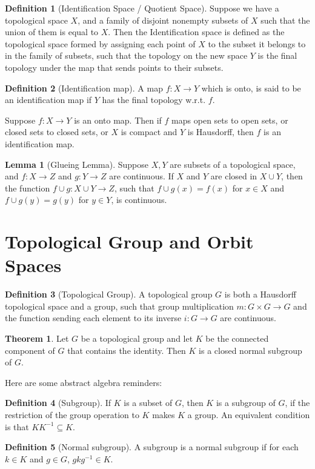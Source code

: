 \documentclass{article}
\theoremstyle{definition}
\newtheorem{definition}{Definition}[section]
\newtheorem{lemma}{Lemma}[section]
\newtheorem{theorem}{Theorem}[section]
\theoremstyle{remark}
\theoremstyle{remark}
\begin{document}
\begin{definition}[Identification Space / Quotient Space]
    Suppose we have a topological space $X$, and a family of disjoint nonempty subsets of $X$ such that the union of them is equal to $X$. Then the Identification space is defined as the topological space formed by assigning each point of $X$ to the subset it belongs to in the family of subsets, such that the topology on the new space $Y$ is the final topology under the map that sends points to their subsets.
\end{definition}

\begin{definition}[Identification map]
    A map $f: X \to Y$ which is onto, is said to be an identification map if $Y$ has the final topology w.r.t. $f$. 
\end{definition}
Suppose $f: X \to Y$ is an onto map. Then if $f$ maps open sets to open sets, or closed sets to closed sets, or $X$ is compact and $Y$ is Hausdorff, then $f$ is an identification map. 

\begin{lemma}[Glueing Lemma]
    Suppose $X, Y$ are subsets of a topological space, and $f: X \to Z$ and $g: Y \to Z$ are continuous. If $X$ and $Y$ are closed in $X \cup Y$, then the function $f \cup g: X \cup Y \to Z$, such that $f\cup g(x) = f(x)$ for $x \in X$ and $f \cup g (y) = g(y)$ for $y \in Y$, is continuous. 
\end{lemma}

\section{Topological Group and Orbit Spaces}

\begin{definition}[Topological Group]
    A topological group $G$ is both a Hausdorff topological space and a group, such that group multiplication $m: G\times G \to G$ and the function sending each element to its inverse $i: G \to G$ are continuous.
\end{definition}

\begin{theorem}
    Let $G$ be a topological group and let $K$ be the connected component of $G$ that contains the identity. Then $K$ is a closed normal subgroup of $G$.
\end{theorem}

Here are some abstract algebra reminders:

\begin{definition}[Subgroup]
If $K$ is a subset of $G$, then $K$ is a subgroup of $G$, if the restriction of the group operation to $K$ makes $K$ a group. An equivalent condition is that $KK^{-1} \subseteq K$. 
\end{definition}
\begin{definition}[Normal subgroup]
    A subgroup is a normal subgroup if for each $k \in K$ and $g\in G$, $gkg^{-1} \in K$. 
\end{definition}
\end{document}
